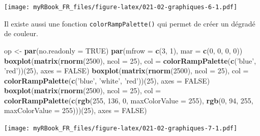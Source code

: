 \documentclass[]{book}
\newenvironment{Shaded}{\begin{snugshade}}{\end{snugshade}}
\newcommand{\DataTypeTok}[1]{\textcolor[rgb]{0.13,0.29,0.53}{#1}}
\newcommand{\DecValTok}[1]{\textcolor[rgb]{0.00,0.00,0.81}{#1}}
\newcommand{\KeywordTok}[1]{\textcolor[rgb]{0.13,0.29,0.53}{\textbf{#1}}}
\newcommand{\NormalTok}[1]{#1}
\newcommand{\OtherTok}[1]{\textcolor[rgb]{0.56,0.35,0.01}{#1}}
\newcommand{\StringTok}[1]{\textcolor[rgb]{0.31,0.60,0.02}{#1}}
\begin{document}
\texttt{[image: myRBook\_FR\_files/figure-latex/021-02-graphiques-6-1.pdf]}

Il existe aussi une fonction \texttt{colorRampPalette()} qui permet de créer un dégradé de couleur.

\begin{Shaded}
\begin{Highlighting}[]
\NormalTok{op <-}\StringTok{ }\KeywordTok{par}\NormalTok{(}\DataTypeTok{no.readonly =} \OtherTok{TRUE}\NormalTok{)}
\KeywordTok{par}\NormalTok{(}\DataTypeTok{mfrow =} \KeywordTok{c}\NormalTok{(}\DecValTok{3}\NormalTok{, }\DecValTok{1}\NormalTok{), }\DataTypeTok{mar =} \KeywordTok{c}\NormalTok{(}\DecValTok{0}\NormalTok{, }\DecValTok{0}\NormalTok{, }\DecValTok{0}\NormalTok{, }\DecValTok{0}\NormalTok{))}
\KeywordTok{boxplot}\NormalTok{(}\KeywordTok{matrix}\NormalTok{(}\KeywordTok{rnorm}\NormalTok{(}\DecValTok{2500}\NormalTok{), }\DataTypeTok{ncol =} \DecValTok{25}\NormalTok{), }
  \DataTypeTok{col =} \KeywordTok{colorRampPalette}\NormalTok{(}\KeywordTok{c}\NormalTok{(}\StringTok{'blue'}\NormalTok{, }\StringTok{'red'}\NormalTok{))(}\DecValTok{25}\NormalTok{), }\DataTypeTok{axes =} \OtherTok{FALSE}\NormalTok{)}
\KeywordTok{boxplot}\NormalTok{(}\KeywordTok{matrix}\NormalTok{(}\KeywordTok{rnorm}\NormalTok{(}\DecValTok{2500}\NormalTok{), }\DataTypeTok{ncol =} \DecValTok{25}\NormalTok{), }
  \DataTypeTok{col =} \KeywordTok{colorRampPalette}\NormalTok{(}\KeywordTok{c}\NormalTok{(}\StringTok{'blue'}\NormalTok{, }\StringTok{'white'}\NormalTok{, }\StringTok{'red'}\NormalTok{))(}\DecValTok{25}\NormalTok{), }\DataTypeTok{axes =} \OtherTok{FALSE}\NormalTok{)}
\KeywordTok{boxplot}\NormalTok{(}\KeywordTok{matrix}\NormalTok{(}\KeywordTok{rnorm}\NormalTok{(}\DecValTok{2500}\NormalTok{), }\DataTypeTok{ncol =} \DecValTok{25}\NormalTok{), }
  \DataTypeTok{col =}  \KeywordTok{colorRampPalette}\NormalTok{(}\KeywordTok{c}\NormalTok{(}\KeywordTok{rgb}\NormalTok{(}\DecValTok{255}\NormalTok{, }\DecValTok{136}\NormalTok{, }\DecValTok{0}\NormalTok{, }\DataTypeTok{maxColorValue =} \DecValTok{255}\NormalTok{),  }
  \KeywordTok{rgb}\NormalTok{(}\DecValTok{0}\NormalTok{, }\DecValTok{94}\NormalTok{, }\DecValTok{255}\NormalTok{, }\DataTypeTok{maxColorValue =} \DecValTok{255}\NormalTok{)))(}\DecValTok{25}\NormalTok{), }\DataTypeTok{axes =} \OtherTok{FALSE}\NormalTok{)}
\end{Highlighting}
\end{Shaded}

\texttt{[image: myRBook\_FR\_files/figure-latex/021-02-graphiques-7-1.pdf]}
\end{document}
